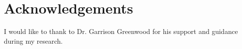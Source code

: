 \chapter*{Acknowledgements}

I would like to thank to Dr. Garrison Greenwood for his support and guidance during my research.
\clearpage
